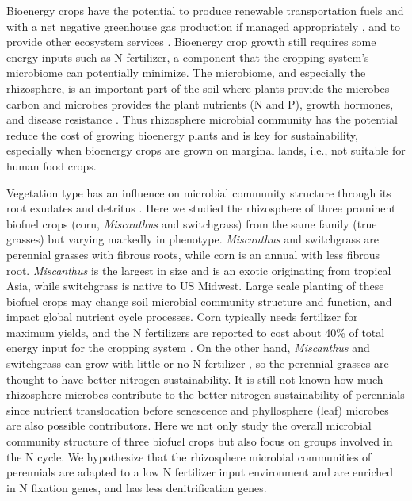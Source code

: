 \documentclass[]{msu-thesis}
\begin{document}
Bioenergy crops have the potential to produce renewable transportation fuels
and with a net negative greenhouse gas production if managed appropriately
\cite{gelfand_sustainable_2013}, and to provide other ecosystem services
\cite{landis_increasing_2008,werling_perennial_2014}. Bioenergy crop growth
still requires some energy inputs such as N fertilizer, a component that the
cropping system's microbiome can potentially minimize. The microbiome, and
especially the rhizosphere, is an important part of the soil where plants
provide the microbes carbon and microbes provides the plant nutrients (N and
P), growth hormones, and disease resistance
\cite{bulgarelli_structure_2013,baudoin_impact_2003,dennis_are_2010}.  Thus
rhizosphere microbial community has the potential reduce the cost of growing
bioenergy plants and is key for sustainability, especially when bioenergy crops
are grown on marginal lands, i.e., not suitable for human food crops.

Vegetation type has an influence on microbial community structure through its
root exudates and detritus \cite{smalla_bulk_2001,mao_changes_2011}. Here we
studied the rhizosphere of three prominent biofuel crops (corn,
\textit{Miscanthus} and switchgrass) from the same family (true grasses) but
varying markedly in phenotype. \textit{Miscanthus} and switchgrass are
perennial grasses with fibrous roots, while corn is an annual with less fibrous
root. \textit{Miscanthus} is the largest in size and is an exotic originating
from tropical Asia, while switchgrass is native to US Midwest. Large scale
planting of these biofuel crops may change soil microbial community structure
and function, and impact global nutrient cycle processes. Corn typically needs
fertilizer for maximum yields, and the N fertilizers are reported to cost about
40\% of total energy input for the cropping system \cite{camargo_energy_2013}.
On the other hand, \textit{Miscanthus} and switchgrass can grow with little or
no N fertilizer
\cite{schwarz_effect_1994,mao_impact_2013,parrish_biology_2005}, so the
perennial grasses are thought to have better nitrogen sustainability. It is
still not known how much rhizosphere microbes contribute to the better nitrogen
sustainability of perennials since nutrient translocation before senescence and
phyllosphere (leaf) microbes are also possible contributors. Here we not only
study the overall microbial community structure of three biofuel crops but also
focus on groups involved in the N cycle. We hypothesize that the rhizosphere
microbial communities of perennials are adapted to a low N fertilizer input
environment and are enriched in N fixation genes, and has less denitrification
genes.
\end{document}
